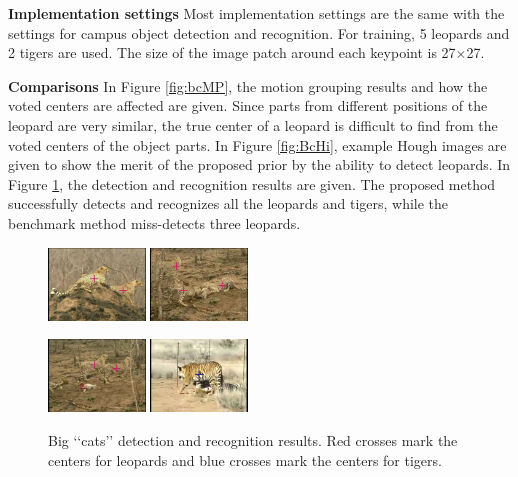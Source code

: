 \documentclass[10pt,twocolumn,letterpaper]{article}
\begin{document}
\textbf{Implementation settings} Most implementation settings are the same with the settings for campus object detection and recognition. For training, 5 leopards and 2 tigers are used. The size of the image patch around each keypoint is 27$\times$27.




\textbf{Comparisons} In Figure \ref{fig:bcMP}, the motion grouping results and how the voted centers are affected are given. Since parts from different positions of the leopard are very similar, the true center of a leopard is difficult to find from the voted centers of the object parts. In Figure \ref{fig:BcHi}, example Hough images are given to show the merit of the proposed prior by the ability to detect leopards. In Figure \ref{fig:bgdr}, the detection and recognition results are given. The proposed method successfully detects and recognizes all the leopards and tigers, while the benchmark method miss-detects three leopards.

\begin{figure}
\centering
\includegraphics[width=0.23\textwidth,bb=0 0 640 480]{leo1.jpg}
\includegraphics[width=0.23\textwidth,bb=0 0 640 480]{leo2.jpg}

\includegraphics[width=0.23\textwidth,bb=0 0 640 480]{leo3.jpg}
\includegraphics[width=0.23\textwidth,bb=0 0 640 480]{ti1.jpg}

\caption{Big {\lq\lq}{cats}{\rq\rq} detection and recognition results. Red crosses mark the centers for leopards and blue crosses mark the centers for tigers.}
\label{fig:bgdr}
\end{figure}
\end{document}
